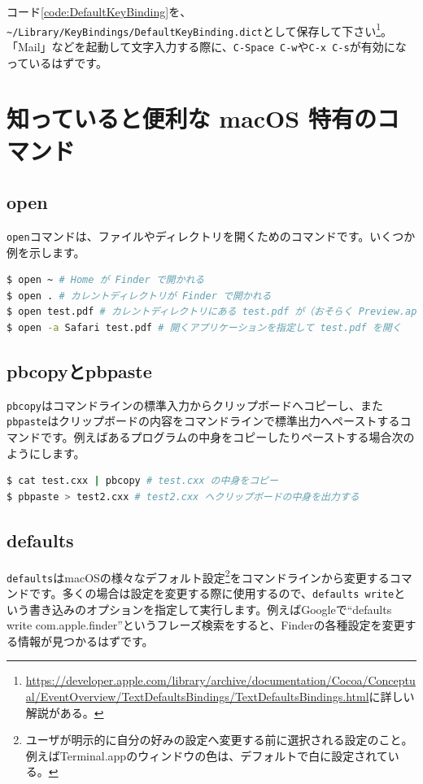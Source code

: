 コード\ref{code:DefaultKeyBinding}を、\texttt{\~{}/Library/KeyBindings/DefaultKeyBinding.dict}として保存して下さい\footnote{\url{https://developer.apple.com/library/archive/documentation/Cocoa/Conceptual/EventOverview/TextDefaultsBindings/TextDefaultsBindings.html}に詳しい解説がある。}。「Mail」などを起動して文字入力する際に、\texttt{C-Space C-w}や\texttt{C-x C-s}が有効になっているはずです。





\section{知っていると便利な macOS 特有のコマンド}
\subsection{open}

\texttt{open}コマンドは、ファイルやディレクトリを開くためのコマンドです。いくつか例を示します。

\begin{lstlisting}[language=bash]
$ open ~ # Home が Finder で開かれる
$ open . # カレントディレクトリが Finder で開かれる
$ open test.pdf # カレントディレクトリにある test.pdf が（おそらく Preview.app で）開かれる
$ open -a Safari test.pdf # 開くアプリケーションを指定して test.pdf を開く
\end{lstlisting}

\subsection{pbcopyとpbpaste}

\texttt{pbcopy}はコマンドラインの標準入力からクリップボードへコピーし、また\texttt{pbpaste}はクリップボードの内容をコマンドラインで標準出力へペーストするコマンドです。例えばあるプログラムの中身をコピーしたりペーストする場合次のようにします。
\begin{lstlisting}[language=bash]
$ cat test.cxx | pbcopy # test.cxx の中身をコピー
$ pbpaste > test2.cxx # test2.cxx へクリップボードの中身を出力する
\end{lstlisting}

\subsection{defaults}
\texttt{defaults}はmacOSの様々なデフォルト設定\footnote{ユーザが明示的に自分の好みの設定へ変更する前に選択される設定のこと。例えばTerminal.appのウィンドウの色は、デフォルトで白に設定されている。}をコマンドラインから変更するコマンドです。多くの場合は設定を変更する際に使用するので、\texttt{defaults write}という書き込みのオプションを指定して実行します。例えばGoogleで``defaults write com.apple.finder''というフレーズ検索をすると、Finderの各種設定を変更する情報が見つかるはずです。

